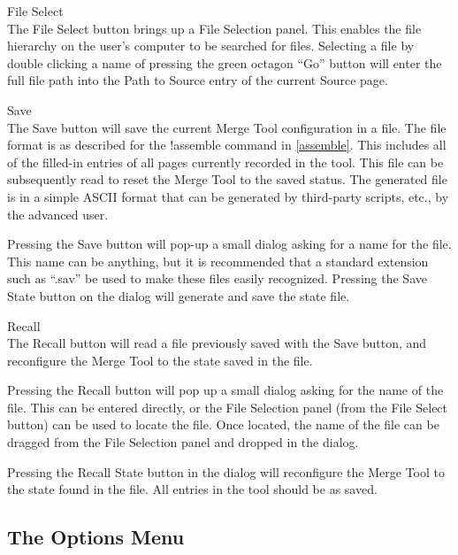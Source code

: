 \begin{description}
\item{\cb File Select}\\
The {\cb File Select} button brings up a {\cb File Selection} panel. 
This enables the file hierarchy on the user's computer to be searched
for files.  Selecting a file by double clicking a name of pressing the
green octagon ``Go'' button will enter the full file path into the
{\cb Path to Source} entry of the current {\cb Source} page.

\item{\cb Save}\\
The {\cb Save} button will save the current {\cb Merge Tool}
configuration in a file.  The file format is as described for the {\cb
!assemble} command in \ref{assemble}.  This includes all of the
filled-in entries of all pages currently recorded in the tool.  This
file can be subsequently read to reset the {\cb Merge Tool} to the
saved status.  The generated file is in a simple ASCII format that can
be generated by third-party scripts, etc., by the advanced user.

Pressing the {\cb Save} button will pop-up a small dialog asking for a
name for the file.  This name can be anything, but it is recommended
that a standard extension such as ``{\vt .sav}'' be used to make these
files easily recognized.  Pressing the {\cb Save State} button on the
dialog will generate and save the state file.

\item{\cb Recall}\\
The {\cb Recall} button will read a file previously saved with the
{\cb Save} button, and reconfigure the {\cb Merge Tool} to the state
saved in the file.

Pressing the {\cb Recall} button will pop up a small dialog asking for
the name of the file.  This can be entered directly, or the {\cb File
Selection} panel (from the {\cb File Select} button) can be used to
locate the file.  Once located, the name of the file can be dragged
from the {\cb File Selection} panel and dropped in the dialog.

Pressing the {\cb Recall State} button in the dialog will reconfigure
the {\cb Merge Tool} to the state found in the file.  All entries in
the tool should be as saved.
\end{description}

\subsection{The Options Menu}

